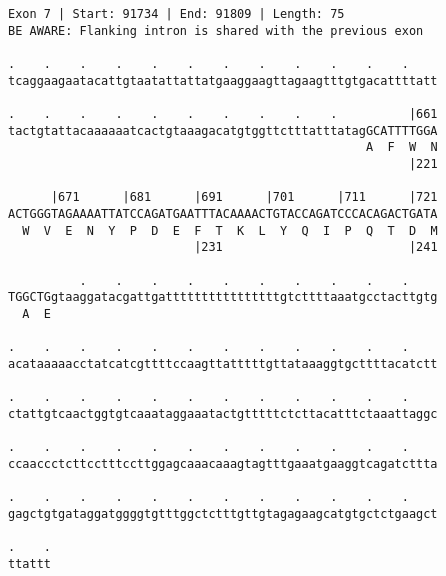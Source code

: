 \documentclass{article}
\begin{document}
\begin{Verbatim}
Exon 7 | Start: 91734 | End: 91809 | Length: 75
BE AWARE: Flanking intron is shared with the previous exon
 
.    .    .    .    .    .    .    .    .    .    .    .    
tcaggaagaatacattgtaatattattatgaaggaagttagaagtttgtgacattttatt
  
.    .    .    .    .    .    .    .    .    .          |661
tactgtattacaaaaaatcactgtaaagacatgtggttctttatttatagGCATTTTGGA
                                                  A  F  W  N
                                                        |221
  
      |671      |681      |691      |701      |711      |721
ACTGGGTAGAAAATTATCCAGATGAATTTACAAAACTGTACCAGATCCCACAGACTGATA
  W  V  E  N  Y  P  D  E  F  T  K  L  Y  Q  I  P  Q  T  D  M
                          |231                          |241
  
          .    .    .    .    .    .    .    .    .    .    
TGGCTGgtaaggatacgattgattttttttttttttttgtcttttaaatgcctacttgtg
  A  E                                                      
  
.    .    .    .    .    .    .    .    .    .    .    .    
acataaaaacctatcatcgttttccaagttatttttgttataaaggtgcttttacatctt
  
.    .    .    .    .    .    .    .    .    .    .    .    
ctattgtcaactggtgtcaaataggaaatactgtttttctcttacatttctaaattaggc
  
.    .    .    .    .    .    .    .    .    .    .    .    
ccaaccctcttcctttccttggagcaaacaaagtagtttgaaatgaaggtcagatcttta
  
.    .    .    .    .    .    .    .    .    .    .    .    
gagctgtgataggatggggtgtttggctctttgttgtagagaagcatgtgctctgaagct
  
.    .
ttattt
\end{Verbatim}
\newpage
\end{document}
